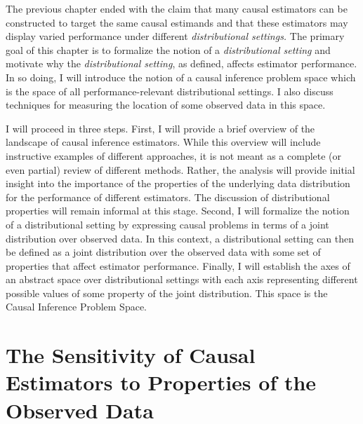 \documentclass[../main.tex]{subfiles}
\begin{document}
The previous chapter ended with the claim that many causal estimators can be constructed to target the same causal estimands and that these estimators may display varied performance under different \textit{distributional settings.} The primary goal of this chapter is to formalize the notion of a \textit{distributional setting} and motivate why the \textit{distributional setting}, as defined, affects estimator performance. In so doing, I will introduce the notion of a causal inference problem space which is the space of all performance-relevant distributional settings. I also discuss techniques for measuring the location of some observed data in this space.\par

\vspace{\baselineskip}

I will proceed in three steps. First, I will provide a brief overview of the landscape of causal inference estimators. While this overview will include instructive examples of different approaches, it is not meant as a complete (or even partial) review of different methods. Rather, the analysis will provide initial insight into the importance of the properties of the underlying data distribution for the performance of different estimators. The discussion of distributional properties will remain informal at this stage. Second, I will formalize the notion of a distributional setting by expressing causal problems in terms of a joint distribution over observed data. In this context, a distributional setting can then be defined as a joint distribution over the observed data with some set of properties that affect estimator performance. Finally, I will establish the axes of an abstract space over distributional settings with each axis representing different possible values of some property of the joint distribution. This space is the Causal Inference Problem Space.\par

\section{The Sensitivity of Causal Estimators to Properties of the Observed Data}
\end{document}

